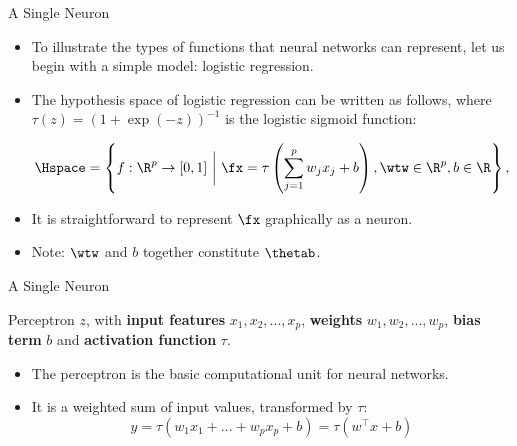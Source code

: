 






\begin{frame} {A Single Neuron}
\begin{itemize}
\item To illustrate the types of functions that neural networks can represent, let us begin with a simple model: logistic regression.
\vspace{5mm}
\item The hypothesis space of logistic regression can be written as follows, where $\tau(z) = (1 + \exp(-z))^{-1}$ is the logistic sigmoid function:\begin{small} $$\Hspace = \left\{f: \R^p \to [0, 1] ~\bigg|~ \fx = \tau\left(\sum_{j = 1}^p w_j x_j + b\right), \wtw \in \R^p, b \in \R \right\},$$ \end{small}
\vspace{3mm}
\item It is straightforward to represent $\fx$ graphically as a neuron.
\vspace{5mm}
\item Note: $\wtw$ and $b$ together constitute $\thetab$.
\end{itemize}
\end{frame}

\begin{vbframe} {A Single Neuron}
\begin{figure}
\centering
{}
\end{figure}
\vspace{-2mm}
\footnotesize Perceptron $z$, with \textbf{input features} $x_1, x_2, ... ,x_p$, \textbf{weights} $w_1, w_2,... ,w_p$, \textbf{bias term} $b$ and \textbf{activation function} $\tau$.
\vspace{.2cm}
\normalsize
\begin{itemize}
\item The perceptron is the basic computational unit for neural networks.
\vspace{.2cm}
\item It is a weighted sum of input values, transformed by $\tau$:
\vspace{-1mm}
$$y = \tau(w_1x_1 + ... + w_px_p +  b) = \tau(w^\top x+b)$$
\end{itemize}
\end{vbframe}

